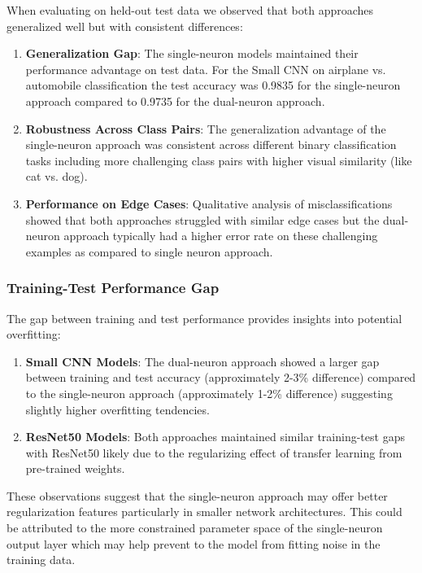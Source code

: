 When evaluating on held-out test data we observed that both approaches generalized well but with consistent differences:

\begin{enumerate}
\item \textbf{Generalization Gap}: The single-neuron models maintained their performance advantage on test data. For the Small CNN on airplane vs. automobile classification the test accuracy was 0.9835 for the single-neuron approach compared to 0.9735 for the dual-neuron approach.

\item \textbf{Robustness Across Class Pairs}: The generalization advantage of the single-neuron approach was consistent across different binary classification tasks including more challenging class pairs with higher visual similarity (like cat vs. dog).

\item \textbf{Performance on Edge Cases}: Qualitative analysis of misclassifications showed that both approaches struggled with similar edge cases but the dual-neuron approach typically had a higher error rate on these challenging examples as compared to single neuron approach.
\end{enumerate}

\subsubsection{Training-Test Performance Gap}

The gap between training and test performance provides insights into potential overfitting:

\begin{enumerate}
\item \textbf{Small CNN Models}: The dual-neuron approach showed a larger gap between training and test accuracy (approximately 2-3\% difference) compared to the single-neuron approach (approximately 1-2\% difference) suggesting slightly higher overfitting tendencies.

\item \textbf{ResNet50 Models}: Both approaches maintained similar training-test gaps with ResNet50 likely due to the regularizing effect of transfer learning from pre-trained weights.
\end{enumerate}

These observations suggest that the single-neuron approach may offer better regularization features particularly in smaller network architectures. This could be attributed to the more constrained parameter space of the single-neuron output layer which may help prevent to the model from fitting noise in the training data.

